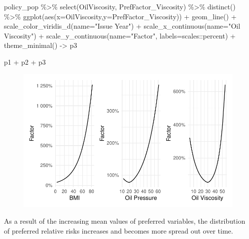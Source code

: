 \documentclass[
  letterpaper,
  DIV=11,
  numbers=noendperiod]{scrartcl}
\newenvironment{Shaded}{\begin{snugshade}}{\end{snugshade}}
\newcommand{\AttributeTok}[1]{\textcolor[rgb]{0.40,0.45,0.13}{#1}}
\newcommand{\FunctionTok}[1]{\textcolor[rgb]{0.28,0.35,0.67}{#1}}
\newcommand{\NormalTok}[1]{\textcolor[rgb]{0.00,0.23,0.31}{#1}}
\newcommand{\OtherTok}[1]{\textcolor[rgb]{0.00,0.23,0.31}{#1}}
\newcommand{\SpecialCharTok}[1]{\textcolor[rgb]{0.37,0.37,0.37}{#1}}
\newcommand{\StringTok}[1]{\textcolor[rgb]{0.13,0.47,0.30}{#1}}
\begin{document}
\begin{Shaded}
\begin{Highlighting}[]
\NormalTok{policy\_pop }\SpecialCharTok{\%\textgreater{}\%}
  \FunctionTok{select}\NormalTok{(OilViscosity, PrefFactor\_Viscosity) }\SpecialCharTok{\%\textgreater{}\%}
  \FunctionTok{distinct}\NormalTok{() }\SpecialCharTok{\%\textgreater{}\%}
  \FunctionTok{ggplot}\NormalTok{(}\FunctionTok{aes}\NormalTok{(}\AttributeTok{x=}\NormalTok{OilViscosity,}\AttributeTok{y=}\NormalTok{PrefFactor\_Viscosity)) }\SpecialCharTok{+}
  \FunctionTok{geom\_line}\NormalTok{() }\SpecialCharTok{+}
  \FunctionTok{scale\_color\_viridis\_d}\NormalTok{(}\AttributeTok{name=}\StringTok{"Issue Year"}\NormalTok{) }\SpecialCharTok{+} 
  \FunctionTok{scale\_x\_continuous}\NormalTok{(}\AttributeTok{name=}\StringTok{"Oil Viscosity"}\NormalTok{) }\SpecialCharTok{+}
  \FunctionTok{scale\_y\_continuous}\NormalTok{(}\AttributeTok{name=}\StringTok{"Factor"}\NormalTok{, }\AttributeTok{labels=}\NormalTok{scales}\SpecialCharTok{::}\NormalTok{percent) }\SpecialCharTok{+}
  \FunctionTok{theme\_minimal}\NormalTok{() }\OtherTok{{-}\textgreater{}}\NormalTok{ p3}

\NormalTok{p1 }\SpecialCharTok{+}\NormalTok{ p2 }\SpecialCharTok{+}\NormalTok{ p3}
\end{Highlighting}
\end{Shaded}

\begin{figure}[H]

{\centering \includegraphics{MakingData_files/figure-pdf/unnamed-chunk-10-1.pdf}

}

\end{figure}

As a result of the increasing mean values of preferred variables, the
distribution of preferred relative risks increases and becomes more
spread out over time.
\end{document}
